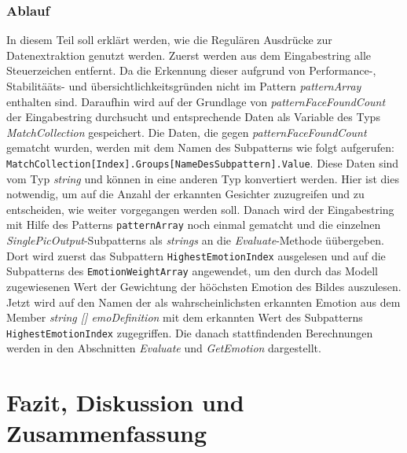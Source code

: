 \documentclass[10pt,a4paper]{report}
\begin{document}
\subsection{Ablauf}
In diesem Teil soll erkl\"{a}rt werden, wie die Regul\"{a}ren Ausdr\"{u}cke zur Datenextraktion genutzt werden. Zuerst werden aus dem Eingabestring alle Steuerzeichen entfernt. Da die Erkennung dieser aufgrund
 von Performance-, Stabilit\"{a}\"{a}ts- und \"{u}bersichtlichkeitsgr\"{u}nden nicht im Pattern \textit{patternArray} enthalten sind. Daraufhin wird auf der Grundlage von \textit{patternFaceFoundCount}
 der Eingabestring durchsucht und entsprechende Daten als Variable des Typs \textit{MatchCollection} gespeichert. Die Daten, die gegen \textit{patternFaceFoundCount} gematcht wurden, werden mit dem Namen
 des Subpatterns wie folgt aufgerufen: \texttt{MatchCollection[Index].Groups[NameDesSubpattern].Value}. Diese Daten sind vom Typ \textit{string} und k\"{o}nnen  in eine anderen Typ konvertiert werden. Hier ist dies notwendig, um auf die Anzahl der erkannten Gesichter zuzugreifen und zu entscheiden, wie weiter vorgegangen werden soll.
 Danach wird der Eingabestring mit Hilfe des Patterns \texttt{patternArray} noch einmal gematcht und die einzelnen \textit{SinglePicOutput}-Subpatterns als \textit{strings} an die \textit{Evaluate}-Methode \"{u}\"{u}bergeben. Dort wird zuerst das Subpattern \texttt{HighestEmotionIndex} ausgelesen und auf die Subpatterns des \texttt{EmotionWeightArray} angewendet, um den durch das Modell zugewiesenen Wert der Gewichtung der h\"{o}\"{o}chsten Emotion des Bildes auszulesen. Jetzt wird auf den Namen der als wahrscheinlichsten erkannten Emotion aus dem Member \textit{string [] emoDefinition} mit dem erkannten Wert des Subpatterns \texttt{HighestEmotionIndex} zugegriffen. Die danach stattfindenden Berechnungen werden in den Abschnitten \textit{Evaluate} und \textit{GetEmotion} dargestellt. 

\chapter{Fazit, Diskussion und Zusammenfassung}

\end{document}
